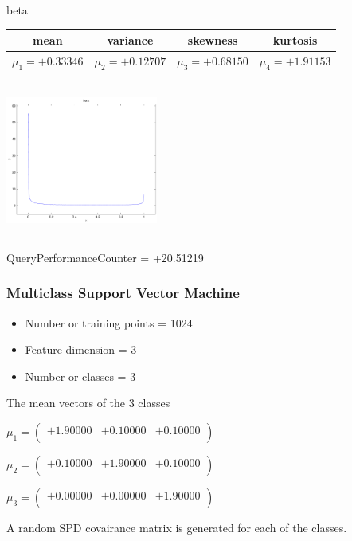 \documentclass[9pt]{article}
\theoremstyle{plain}
\theoremstyle{definition}
\theoremstyle{remark}
\numberwithin{equation}{section}
\begin{document}
\newpage
beta \begin{tabular}{|c|c|c|c|}  mean & variance & skewness & kurtosis \\  \hline
$\mu_1 = +0.33346$ & $\mu_2 = +0.12707$ & $\mu_3 = +0.68150$ & $\mu_4 =+1.91153$ \\
\end{tabular}

\includegraphics[width=5cm,height=5cm]{beta.pdf}

QueryPerformanceCounter  =  +20.51219
\subsubsection{Multiclass Support Vector Machine }
\begin{itemize}
\item Number or training points = 1024
\item Feature dimension = 3
\item Number or classes = 3
\end{itemize}
{The mean vectors of the 3 classes}

$\mu_1 = \left(
\begin{array}{
ccc}
+1.90000 & +0.10000 & +0.10000 \\
\end{array}
\right)$ \newline 

$\mu_2 = \left(
\begin{array}{
ccc}
+0.10000 & +1.90000 & +0.10000 \\
\end{array}
\right)$ \newline 

$\mu_3 = \left(
\begin{array}{
ccc}
+0.00000 & +0.00000 & +1.90000 \\
\end{array}
\right)$ \newline 

A random SPD covairance matrix is generated for each of the classes.\newline
\end{document}
